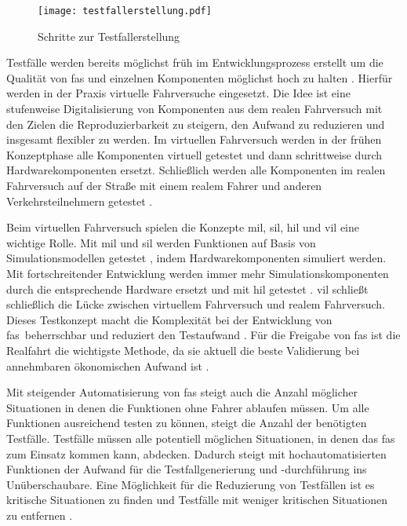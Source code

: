 \begin{figure}[h]
\centering
\texttt{[image: testfallerstellung.pdf]}
\caption{Schritte zur Testfallerstellung \cite{schuldt2013effiziente}}
\label{fig_testfallerstellung}
\end{figure}

Testfälle werden bereits möglichst früh im Entwicklungsprozess erstellt um die Qualität von \gls{fas} und einzelnen Komponenten möglichst hoch zu halten \cite{wachenfeld2015freigabe}. Hierfür werden in der Praxis virtuelle Fahrversuche eingesetzt. Die Idee ist eine stufenweise Digitalisierung von Komponenten aus dem realen Fahrversuch mit den Zielen die Reproduzierbarkeit zu steigern, den Aufwand zu reduzieren und insgesamt flexibler zu werden. Im virtuellen Fahrversuch werden in der frühen Konzeptphase alle Komponenten virtuell getestet und dann schrittweise durch Hardwarekomponenten ersetzt. Schließlich werden alle Komponenten im realen Fahrversuch auf der Straße mit einem realem Fahrer und anderen Verkehrsteilnehmern getestet \cite{hakuli2015virtuelle}.

Beim virtuellen Fahrversuch spielen die Konzepte \gls{mil}, \gls{sil}, \gls{hil} und \gls{vil} eine wichtige Rolle. Mit \gls{mil} und \gls{sil} werden Funktionen auf Basis von Simulationsmodellen getestet \cite{berg2015vehicle}, indem Hardwarekomponenten simuliert werden. Mit fortschreitender Entwicklung werden immer mehr Simulationskomponenten durch die entsprechende Hardware ersetzt und mit \gls{hil} getestet \cite{hakuli2015virtuelle}. \gls{vil} schließt schließlich die Lücke zwischen virtuellem Fahrversuch und realem Fahrversuch. Dieses Testkonzept macht die Komplexität bei der Entwicklung von \gls{fas} beherrschbar und reduziert den Testaufwand \cite{schwab2014durchgangige}. Für die Freigabe von \gls{fas} ist die Realfahrt die wichtigste Methode, da sie aktuell die beste Validierung bei annehmbaren ökonomischen Aufwand ist \cite{wachenfeld2015freigabe}.

Mit steigender Automatisierung von \gls{fas} steigt auch die Anzahl möglicher Situationen in denen die Funktionen ohne Fahrer ablaufen müssen. Um alle Funktionen ausreichend testen zu können, steigt die Anzahl der benötigten Testfälle. Testfälle müssen alle potentiell möglichen Situationen, in denen das \gls{fas} zum Einsatz kommen kann, abdecken. Dadurch steigt mit hochautomatisierten Funktionen der Aufwand für die Testfallgenerierung und -durchführung ins Unüberschaubare. Eine Möglichkeit für die Reduzierung von Testfällen ist es kritische Situationen zu finden und Testfälle mit weniger kritischen Situationen zu entfernen \cite{wachenfeld2015freigabe}.

